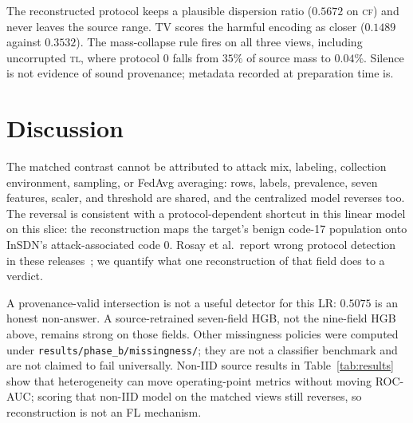\documentclass[conference,a4paper]{IEEEtran}
\begin{document}
The reconstructed protocol keeps a plausible dispersion ratio ($0.5672$ on \textsc{cf}) and never leaves the source range. TV scores the harmful encoding as closer ($0.1489$ against $0.3532$). The mass-collapse rule fires on all three views, including uncorrupted \textsc{tl}, where protocol 0 falls from $35\%$ of source mass to $0.04\%$. Silence is not evidence of sound provenance; metadata recorded at preparation time is.

\section{Discussion}
The matched contrast cannot be attributed to attack mix, labeling, collection environment, sampling, or FedAvg averaging: rows, labels, prevalence, seven features, scaler, and threshold are shared, and the centralized model reverses too. The reversal is consistent with a protocol-dependent shortcut in this linear model on this slice: the reconstruction maps the target's benign code-17 population onto InSDN's attack-associated code 0. Rosay et al.\ report wrong protocol detection in these releases~\cite{rosay}; we quantify what one reconstruction of that field does to a verdict.

A provenance-valid intersection is not a useful detector for this LR: $0.5075$ is an honest non-answer. A source-retrained seven-field HGB, not the nine-field HGB above, remains strong on those fields. Other missingness policies were computed under \texttt{results/phase\_b/missingness/}; they are not a classifier benchmark and are not claimed to fail universally. Non-IID source results in Table~\ref{tab:results} show that heterogeneity can move operating-point metrics without moving ROC-AUC; scoring that non-IID model on the matched views still reverses, so reconstruction is not an FL mechanism.
\end{document}
